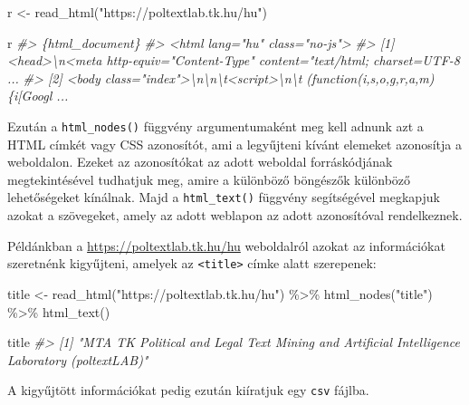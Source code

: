 \documentclass[
]{book}
\newenvironment{Shaded}{\begin{snugshade}}{\end{snugshade}}
\newcommand{\CommentTok}[1]{\textcolor[rgb]{0.56,0.35,0.01}{\textit{#1}}}
\newcommand{\FunctionTok}[1]{\textcolor[rgb]{0.00,0.00,0.00}{#1}}
\newcommand{\NormalTok}[1]{#1}
\newcommand{\OtherTok}[1]{\textcolor[rgb]{0.56,0.35,0.01}{#1}}
\newcommand{\SpecialCharTok}[1]{\textcolor[rgb]{0.00,0.00,0.00}{#1}}
\newcommand{\StringTok}[1]{\textcolor[rgb]{0.31,0.60,0.02}{#1}}
\begin{document}
\begin{Shaded}
\begin{Highlighting}[]

\NormalTok{r }\OtherTok{\textless{}{-}} \FunctionTok{read\_html}\NormalTok{(}\StringTok{"https://poltextlab.tk.hu/hu"}\NormalTok{)}

\NormalTok{r}
\CommentTok{\#\textgreater{} \{html\_document\}}
\CommentTok{\#\textgreater{} \textless{}html lang="hu" class="no{-}js"\textgreater{}}
\CommentTok{\#\textgreater{} [1] \textless{}head\textgreater{}\textbackslash{}n\textless{}meta http{-}equiv="Content{-}Type" content="text/html; charset=UTF{-}8 ...}
\CommentTok{\#\textgreater{} [2] \textless{}body class="index"\textgreater{}\textbackslash{}n\textbackslash{}n\textbackslash{}t\textless{}script\textgreater{}\textbackslash{}n\textbackslash{}t  (function(i,s,o,g,r,a,m)\{i[\textquotesingle{}Googl ...}
\end{Highlighting}
\end{Shaded}

Ezután a \texttt{html\_nodes()} függvény argumentumaként meg kell adnunk
azt a HTML címkét vagy CSS azonosítót, ami a legyűjteni kívánt elemeket
azonosítja a weboldalon. Ezeket az azonosítókat az adott weboldal
forráskódjának megtekintésével tudhatjuk meg, amire a különböző
böngészők különböző lehetőségeket kínálnak. Majd a \texttt{html\_text()}
függvény segítségével megkapjuk azokat a szövegeket, amely az adott
weblapon az adott azonosítóval rendelkeznek.

Példánkban a \url{https://poltextlab.tk.hu/hu} weboldalról azokat az
információkat szeretnénk kigyűjteni, amelyek az
\texttt{\textless{}title\textgreater{}} címke alatt szerepenek:

\begin{Shaded}
\begin{Highlighting}[]

\NormalTok{title }\OtherTok{\textless{}{-}} \FunctionTok{read\_html}\NormalTok{(}\StringTok{"https://poltextlab.tk.hu/hu"}\NormalTok{) }\SpecialCharTok{\%\textgreater{}\%}
  \FunctionTok{html\_nodes}\NormalTok{(}\StringTok{"title"}\NormalTok{) }\SpecialCharTok{\%\textgreater{}\%}
  \FunctionTok{html\_text}\NormalTok{()}


\NormalTok{title}
\CommentTok{\#\textgreater{} [1] "MTA TK Political and Legal Text Mining and Artificial Intelligence Laboratory (poltextLAB)"}
\end{Highlighting}
\end{Shaded}

A kigyűjtött információkat pedig ezután kiíratjuk egy \texttt{csv}
fájlba.
\end{document}
